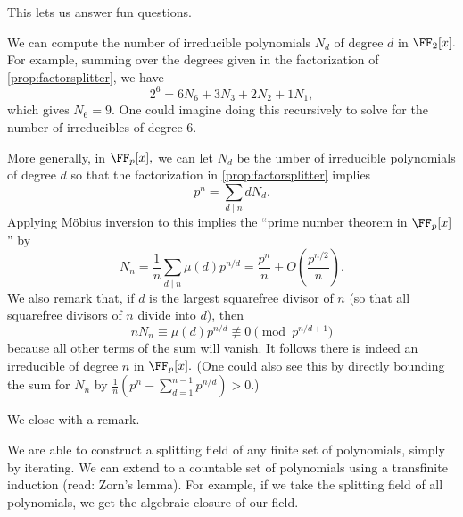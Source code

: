 This lets us answer fun questions.
\begin{example}
	We can compute the number of irreducible polynomials $N_d$ of degree $d$ in $\FF_2[x].$ For example, summing over the degrees given in the factorization of \autoref{prop:factorsplitter}, we have
	\[2^6=6N_6+3N_3+2N_2+1N_1,\]
	which gives $N_6=9.$ One could imagine doing this recursively to solve for the number of irreducibles of degree $6.$
\end{example}
\begin{remark}[Nir]
	More generally, in $\FF_p[x],$ we can let $N_d$ be the umber of irreducible polynomials of degree $d$ so that the factorization in \autoref{prop:factorsplitter} implies
	\[p^n=\sum_{d\mid n}dN_d.\]
	Applying M\"obius inversion to this implies the ``prime number theorem in $\FF_p[x]$'' by
	\[N_n=\frac1n\sum_{d\mid n}\mu(d)p^{n/d}=\frac{p^n}n+O\left(\frac{p^{n/2}}n\right).\]
	We also remark that, if $d$ is the largest squarefree divisor of $n$ (so that all squarefree divisors of $n$ divide into $d$), then
	\[nN_n\equiv\mu(d)p^{n/d}\not\equiv0\pmod{p^{n/d+1}}\]
	because all other terms of the sum will vanish. It follows there is indeed an irreducible of degree $n$ in $\FF_p[x].$ (One could also see this by directly bounding the sum for $N_n$ by $\frac1n\left(p^n-\sum_{d=1}^{n-1}p^{n/d}\right)>0.$)
\end{remark}
We close with a remark.
\begin{remark}
	We are able to construct a splitting field of any finite set of polynomials, simply by iterating. We can extend to a countable set of polynomials using a transfinite induction (read: Zorn's lemma). For example, if we take the splitting field of all polynomials, we get the algebraic closure of our field.
\end{remark}
